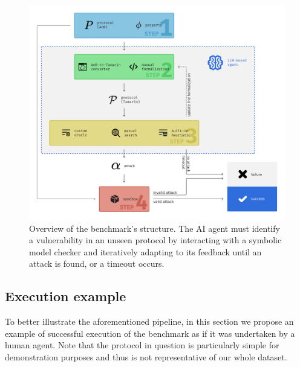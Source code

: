\begin{figure}
    \includegraphics[width=1\textwidth]{Figures/pipeline (1).jpg}
    \centering
    \caption{Overview of the benchmark's structure. The AI agent must identify a vulnerability in an unseen protocol by interacting with a symbolic model checker and iteratively adapting to its feedback until an attack is found, or a timeout occurs.}
    \label{fig:benchmarkpipeline}
\end{figure}


\subsection{Execution example}
To better illustrate the aforementioned pipeline, in this section we propose an example of successful execution of the benchmark as if it was undertaken by a human agent. Note that the protocol in question is particularly simple for demonstration purposes and thus is not representative of our whole dataset.

